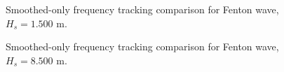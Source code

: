\documentclass[11pt,letterpaper]{article}
\begin{document}
    \begin{figure}[H]\centering
    \resizebox{\textwidth}{!}{}
    \caption{Smoothed-only frequency tracking comparison for Fenton wave, $H_s = 1.500$ m.}
    \label{fig:freqtrack_fenton_medium_smooth}
    \end{figure}

    \begin{figure}[H]\centering
    \resizebox{\textwidth}{!}{}
    \caption{Smoothed-only frequency tracking comparison for Fenton wave, $H_s = 8.500$ m.}
    \label{fig:freqtrack_fenton_high_smooth}
    \end{figure}
\end{document}
